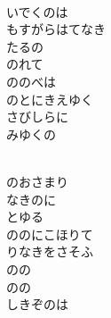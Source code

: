 \documentclass[10pt,b5j]{tarticle} %
\begin{document}
\begin{enumerate}
\begin{minipage}[c]{\blocksize}
    \end{minipage}
    \begin{minipage}[c]{\blocksize}
        
        \vspace{\linespace}
        \item~\\
        いでくのは\\
        もすがらはてなき\\
        たるの\\
        のれて\\
        ののべは\\
        のとにきえゆく\\
        さびしらに\\
        みゆくの
        
    \end{minipage}
    \begin{minipage}[c]{\blocksize}
        
        \vspace{\linespace}
        \item~\\
        のおさまり\\
        なきのに\\
        とゆる\\
        ののにこほりて\\
        りなきをさそふ\\
        のの\\
        のの\\
        しきぞのは
        
    \end{minipage}
    \begin{minipage}[c]{\blocksize}
        

\end{minipage}
\end{enumerate}
\end{document}
